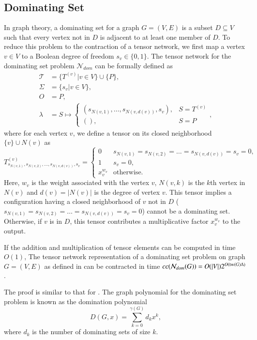 \documentclass[review, onefignum, onetabnum]{siamart190516}
\begin{document}
\subsection{Dominating Set}
In graph theory, a dominating set for a graph $G = (V, E)$ is a subset $D \subseteq V$ such that every vertex not in $D$ is adjacent to at least one member of $D$.
To reduce this problem to the contraction of a tensor network, we first map a vertex $v\in V$ to a Boolean degree of freedom $s_v\in\{0, 1\}$.
The tensor network for the dominating set problem $\mathcal{N}_{dom}$ can be formally defined as
\begin{equation}\label{eq:domtensornetwork}
\begin{split}
    \mathcal{T} &= \{T^{(v)} | v\in V\} \cup \{P\},\\
    \Sigma &= \{s_v | v \in V\},\\
    O &= P,\\
    \lambda &= S \mapsto \begin{cases}
                    (s_{N(v,1)}, \ldots, s_{N(v,d(v))}, s_v), & S = T^{(v)}\\
                    (), & S = P
                    \end{cases},
\end{split}
\end{equation}
where for each vertex $v$, we define a tensor on its closed neighborhood $\{v\} \cup N(v)$ as
\begin{equation}
T^{(v)}_{s_{N(v, 1)},s_{N(v, 2)},\ldots,s_{N(v, d(v))},s_v} = \begin{cases}
    0 & s_{N(v, 1)}=s_{N(v, 2)}=\ldots=s_{N(v, d(v))}=s_v=0,\\
    1 & s_v=0,\\
    x^{w_v}_v & \text{otherwise}.
\end{cases}
\end{equation}
Here, $w_v$ is the weight associated with the vertex $v$, $N(v, k)$ is the $k$th vertex in $N(v)$ and $d(v) = |N(v)|$ is the degree of vertex $v$.
This tensor implies a configuration having a closed neighborhood of $v$ not in $D$ ($s_{N(v, 1)}=s_{N(v, 2)}=\ldots=s_{N(v, d(v))}=s_v=0$) cannot be a dominating set.
Otherwise, if $v$ is in $D$, this tensor contributes a multiplicative factor $x_v^{w_v}$ to the output. 
\begin{theorem}\label{thm:domcomplex}
    If the addition and multiplication of tensor elements can be computed in time $O(1)$,
    The tensor network representation of a dominating set problem on graph $G=(V,E)$ as defined in  can be contracted in time $cc(\mathcal{N}_{dom}(G)) = O(|V|)2^{O({\rm tw}(G)\Delta)}$.
\end{theorem}
The proof is similar to that for .
The graph polynomial for the dominating set problem is known as the domination polynomial~\cite{Alikhani2009}
\begin{equation}
D(G, x) = \sum_{k=0}^{\gamma(G)} d_k x^k,
\end{equation}
where $d_k$ is the number of dominating sets of size $k$.
\end{document}
